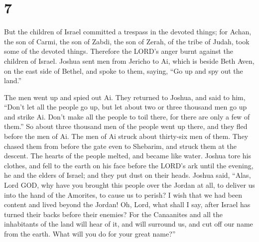 \hypertarget{section-6}{%
\section{7}\label{section-6}}

 But the children of Israel committed a trespass in the
devoted things; for Achan, the son of Carmi, the son of Zabdi, the son
of Zerah, of the tribe of Judah, took some of the devoted things.
Therefore the LORD's anger burnt against the children of Israel.
 Joshua sent men from Jericho to Ai, which is beside Beth
Aven, on the east side of Bethel, and spoke to them, saying, ``Go up and
spy out the land.''

The men went up and spied out Ai.  They returned to Joshua,
and said to him, ``Don't let all the people go up, but let about two or
three thousand men go up and strike Ai. Don't make all the people to
toil there, for there are only a few of them.''  So about
three thousand men of the people went up there, and they fled before the
men of Ai.  The men of Ai struck about thirty-six men of
them. They chased them from before the gate even to Shebarim, and struck
them at the descent. The hearts of the people melted, and became like
water.  Joshua tore his clothes, and fell to the earth on
his face before the LORD's ark until the evening, he and the elders of
Israel; and they put dust on their heads.  Joshua said,
``Alas, Lord GOD, why have you brought this people over the Jordan at
all, to deliver us into the hand of the Amorites, to cause us to perish?
I wish that we had been content and lived beyond the Jordan!
 Oh, Lord, what shall I say, after Israel has turned their
backs before their enemies?  For the Canaanites and all the
inhabitants of the land will hear of it, and will surround us, and cut
off our name from the earth. What will you do for your great name?''

